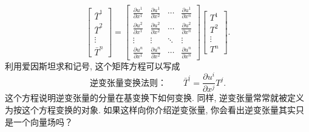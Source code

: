 \[
\begin{bmatrix}\bar{T}^1\\\bar{T}^2\\\vdots\\\bar{T}^n\end{bmatrix}
=
\begin{bmatrix}
\frac{\partial u^1}{\partial x^1}&\frac{\partial u^1}{\partial x^2}&\cdots&\frac{\partial u^1}{\partial x^n}\\
\frac{\partial u^2}{\partial x^1}&\frac{\partial u^2}{\partial x^2}&\cdots&\frac{\partial u^2}{\partial x^n}\\
\vdots&\vdots&\ddots&\vdots\\
\frac{\partial u^n}{\partial x^1}&\frac{\partial u^n}{\partial x^2}&\cdots&\frac{\partial u^n}{\partial x^n}
\end{bmatrix}
\begin{bmatrix}T^1\\T^2\\\vdots\\T^n\end{bmatrix}.
\]
利用爱因斯坦求和记号, 这个矩阵方程可以写成
\[
\text{逆变张量变换法则：}\qquad \bar{T}^i=\frac{\partial u^i}{\partial x^j}T^j.
\]
这个方程说明逆变张量的分量在基变换下如何变换. 同样, 逆变张量常常就被定义为按这个方程变换的对象. 如果这样向你介绍逆变张量, 你会看出逆变张量其实只是一个向量场吗？

